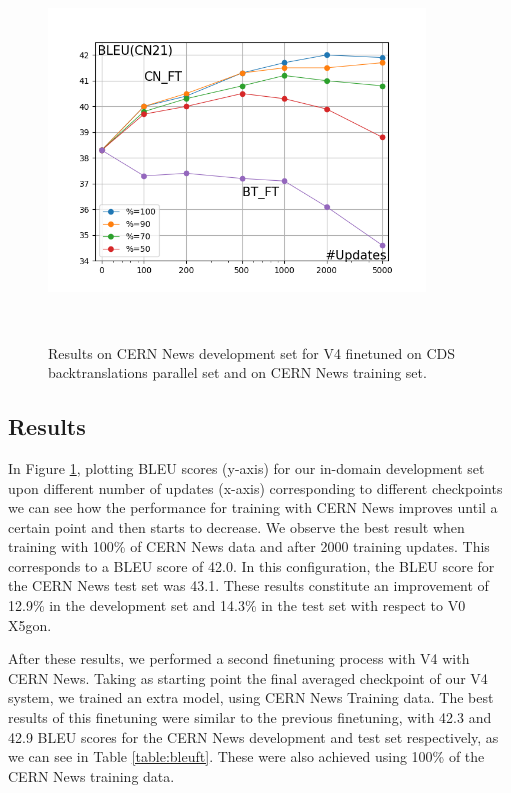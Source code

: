 \documentclass[11pt,english,listoffigures,listoftables]{tfgetsinf}
\begin{document}
\begin{figure}
\centering
\includegraphics[width=10cm,keepaspectratio,height=10cm]{resources/CN21_bleu.png}
\caption{Results on CERN News development set for V4 finetuned on CDS backtranslations parallel set and on CERN News training set.}\label{pmid:cnft}
\end{figure}
\subsection{Results}

In Figure \ref{pmid:cnft},
plotting BLEU scores (y-axis) for our in-domain development set upon different number of updates (x-axis) corresponding to different checkpoints we can see how the performance for training with CERN News improves until a certain point and then starts to decrease. 
We observe the best result when training with 100\% of CERN News data and after 2000 training updates. This corresponds to a BLEU score of 42.0. In this configuration, the BLEU score for the CERN News test set was 43.1. These results constitute an improvement of 12.9\% in the development set and 14.3\% in the test set with respect to V0 X5gon.

After these results, we performed a second finetuning process with V4 with CERN News. Taking as starting point the final averaged checkpoint of our V4 system, we trained an extra model, using CERN News Training data. The best results of this finetuning were similar to the previous finetuning, with 42.3 and 42.9 BLEU scores for the CERN News development and test set respectively, as we can see in Table \ref{table:bleuft}. These were also achieved using 100\% of the CERN News training data.  
\end{document}
